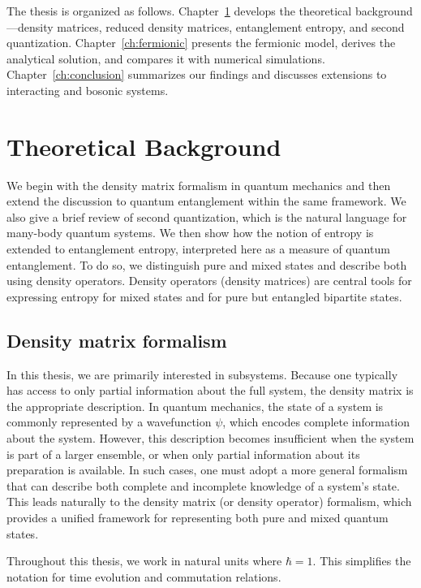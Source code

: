 \documentclass[12pt,oneside,openright]{report}
\theoremstyle{definition}
\theoremstyle{plain}
\theoremstyle{remark}
\begin{document}
The thesis is organized as follows. Chapter~\ref{ch:theory} develops the theoretical background---density matrices, reduced density matrices, entanglement entropy, and second quantization. Chapter~\ref{ch:fermionic} presents the fermionic model, derives the analytical solution, and compares it with numerical simulations. Chapter~\ref{ch:conclusion} summarizes our findings and discusses extensions to interacting and bosonic systems.


\chapter{Theoretical Background}
\label{ch:theory}
We begin with the density matrix formalism in quantum mechanics and then extend the discussion to quantum entanglement within the same framework.
We also give a brief review of second quantization, which is the natural language for many-body quantum systems.
We then show how the notion of entropy is extended to entanglement entropy, interpreted here as a measure of quantum entanglement.
To do so, we distinguish pure and mixed states and describe both using density operators.
Density operators (density matrices) are central tools for expressing entropy for mixed states and for pure but entangled bipartite states.


\section{Density matrix formalism}
\label{sec:density_matrix}
In this thesis, we are primarily interested in subsystems.
Because one typically has access to only partial information about the full system, the density matrix is the appropriate description.
In quantum mechanics, the state of a system is commonly represented by a wavefunction $\psi$,
which encodes complete information about the system. However, this description becomes 
insufficient when the system is part of a larger ensemble, or when only partial information about its preparation is available.
In such cases, one must adopt a more general formalism that can describe both complete and incomplete knowledge of a system’s state.
This leads naturally to the density matrix (or density operator) formalism, which provides a unified framework for representing 
both pure and mixed quantum states.

Throughout this thesis, we work in natural units where $\hbar = 1$. This simplifies the notation for time evolution and commutation relations.
\end{document}
